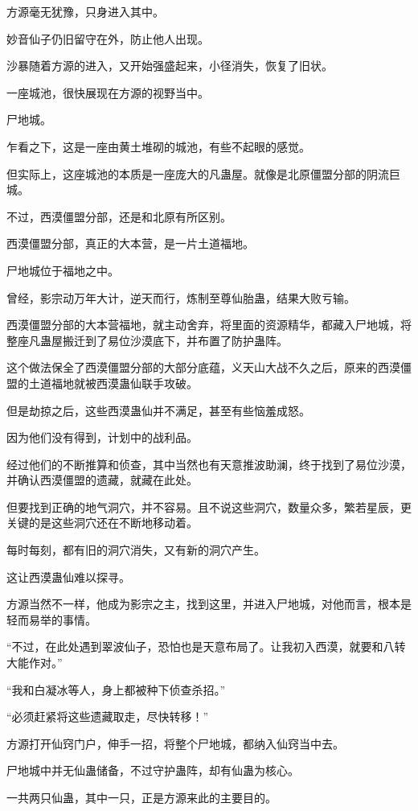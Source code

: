 \begin{this_body}
方源毫无犹豫，只身进入其中。

妙音仙子仍旧留守在外，防止他人出现。

沙暴随着方源的进入，又开始强盛起来，小径消失，恢复了旧状。

一座城池，很快展现在方源的视野当中。

尸地城。

乍看之下，这是一座由黄土堆砌的城池，有些不起眼的感觉。

但实际上，这座城池的本质是一座庞大的凡蛊屋。就像是北原僵盟分部的阴流巨城。

不过，西漠僵盟分部，还是和北原有所区别。

西漠僵盟分部，真正的大本营，是一片土道福地。

尸地城位于福地之中。

曾经，影宗动万年大计，逆天而行，炼制至尊仙胎蛊，结果大败亏输。

西漠僵盟分部的大本营福地，就主动舍弃，将里面的资源精华，都藏入尸地城，将整座凡蛊屋搬迁到了易位沙漠底下，并布置了防护蛊阵。

这个做法保全了西漠僵盟分部的大部分底蕴，义天山大战不久之后，原来的西漠僵盟的土道福地就被西漠蛊仙联手攻破。

但是劫掠之后，这些西漠蛊仙并不满足，甚至有些恼羞成怒。

因为他们没有得到，计划中的战利品。

经过他们的不断推算和侦查，其中当然也有天意推波助澜，终于找到了易位沙漠，并确认西漠僵盟的遗藏，就藏在此处。

但要找到正确的地气洞穴，并不容易。且不说这些洞穴，数量众多，繁若星辰，更关键的是这些洞穴还在不断地移动着。

每时每刻，都有旧的洞穴消失，又有新的洞穴产生。

这让西漠蛊仙难以探寻。

方源当然不一样，他成为影宗之主，找到这里，并进入尸地城，对他而言，根本是轻而易举的事情。

“不过，在此处遇到翠波仙子，恐怕也是天意布局了。让我初入西漠，就要和八转大能作对。”

“我和白凝冰等人，身上都被种下侦查杀招。”

“必须赶紧将这些遗藏取走，尽快转移！”

方源打开仙窍门户，伸手一招，将整个尸地城，都纳入仙窍当中去。

尸地城中并无仙蛊储备，不过守护蛊阵，却有仙蛊为核心。

一共两只仙蛊，其中一只，正是方源来此的主要目的。

\end{this_body}

